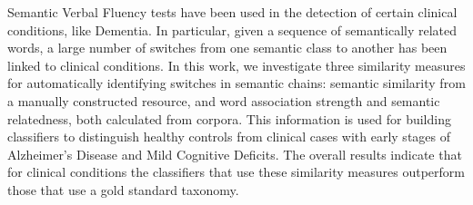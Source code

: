 Semantic Verbal Fluency tests have been used in the detection of certain clinical conditions, like  Dementia. In particular, given a sequence of semantically related words, a large number of switches from one semantic class to another has been linked to clinical conditions. In this work, we investigate three similarity measures for automatically identifying switches in semantic chains: semantic similarity from a manually constructed resource, and word association strength and semantic relatedness, both calculated from corpora. This information is used for building classifiers to distinguish healthy controls from clinical cases with early stages of Alzheimer's Disease and Mild Cognitive Deficits. The overall results indicate that for clinical conditions the classifiers that use these similarity measures outperform those that use a gold standard taxonomy.
